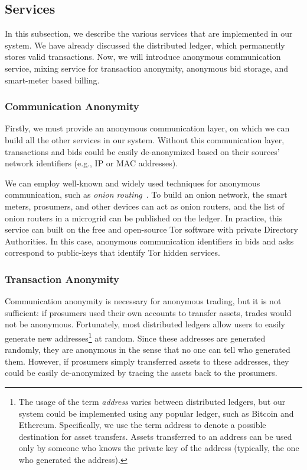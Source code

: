 \subsection{Services}

In this subsection, we describe the various services that are implemented in our system. %
We have already discussed the distributed ledger, which permanently stores valid transactions.
Now, we will introduce anonymous communication service, mixing service for transaction anonymity, anonymous bid storage, and smart-meter based billing.

\subsubsection{Communication Anonymity}
Firstly, we must provide an anonymous communication layer, on which we can build all the other services in our system.
Without this communication layer, transactions and bids could be easily de-anonymized based on their sources' network identifiers (e.g., IP or MAC addresses).

We can employ well-known and widely used techniques for anonymous communication, such as \emph{onion routing}~\cite{reed1998anonymous}.
To build an onion network, the smart meters, prosumers, and other devices can act as onion routers, and the list of onion routers in a microgrid can be published on the ledger.
In practice, this service can built on 
 the free and open-source Tor software with private Directory Authorities.
In this case, anonymous communication identifiers in bids and asks correspond to public-keys that identify Tor hidden services.

\subsubsection{Transaction Anonymity}
Communication anonymity is necessary for anonymous trading, but it is not sufficient: if prosumers used their own accounts to transfer assets, trades would not be anonymous.
Fortunately, most distributed ledgers allow users to easily generate new addresses\footnote{The usage of the term \emph{address} varies between distributed ledgers, but our system could be implemented using any popular ledger, such as Bitcoin and Ethereum. 
Specifically, we use the term address to denote a possible destination for asset transfers. 
Assets transferred to an address can be used only by someone who knows the private key of the address (typically, the one who generated the address).} 
at random.
Since these addresses are generated randomly, they are anonymous in the sense that no one can tell who generated them.
However, if prosumers simply transferred assets to these addresses, they could be easily de-anonymized by tracing the assets back to the prosumers.

